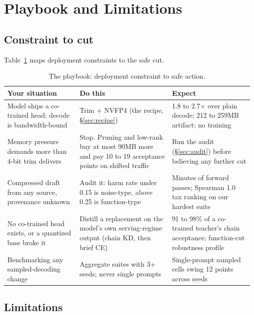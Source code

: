 \documentclass{article}
\newcommand{\x}{$\times$}
\begin{document}
\section{Playbook and Limitations}
\label{sec:playbook}

\subsection{Constraint to cut}
\label{sec:constraint}

Table~\ref{tab:playbook} maps deployment constraints to the safe cut.

\begin{table}[t]
\caption{The playbook: deployment constraint to safe action.}
\label{tab:playbook}
\vskip 0.1in
\centering
\small
\begin{tabular}{p{4.6cm}p{5.4cm}p{5.4cm}}
\toprule
Your situation & Do this & Expect \\
\midrule
Model ships a co-trained head; decode is bandwidth-bound & Trim + NVFP4 (the recipe, \S\ref{sec:recipe}) & 1.8 to 2.7\x{} over plain decode; 212 to 259MB artifact; no training \\
\addlinespace
Memory pressure demands more than 4-bit trim delivers & Stop. Pruning and low-rank buy at most 90MB more and pay 10 to 19 acceptance points on shifted traffic & Run the audit (\S\ref{sec:audit}) before believing any further cut \\
\addlinespace
Compressed draft from any source, provenance unknown & Audit it: harm rate under 0.15 is noise-type, above 0.25 is function-type & Minutes of forward passes; Spearman 1.0 tax ranking on our hardest suite \\
\addlinespace
No co-trained head exists, or a quantized base broke it & Distill a replacement on the model's own serving-regime output (chain KD, then brief CE) & 91 to 98\% of a co-trained teacher's chain acceptance; function-cut robustness profile \\
\addlinespace
Benchmarking any sampled-decoding change & Aggregate suites with 3+ seeds; never single prompts & Single-prompt sampled cells swing 12 points across seeds \\
\bottomrule
\end{tabular}
\end{table}

\subsection{Limitations}
\label{sec:limitations}
\end{document}
